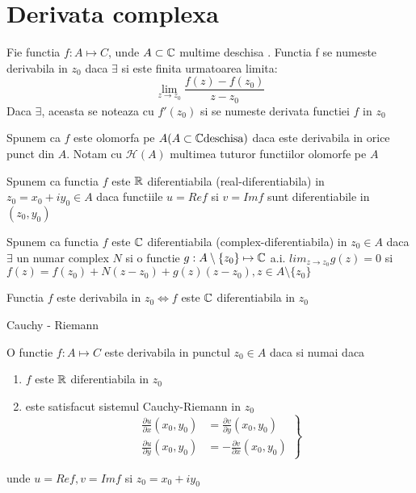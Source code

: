 \section{Derivata complexa}
\begin{definition}
	Fie functia $f:A \mapsto C$, unde $A\subset\mathbb{C}$ multime deschisa . Functia f
	se numeste derivabila in $z_0$ daca $\exists$ si este finita urmatoarea
	limita:
	\begin{equation}
		\lim_{z\to z_0} \frac{f(z)-f(z_0)}{z-z_0}
	\end{equation}
	Daca $\exists$, aceasta se noteaza cu $f'(z_0)$ si se numeste derivata
	functiei $f$ in $z_0$
\end{definition}

\begin{definition}
	Spunem ca $f$ este olomorfa pe $A (A\subset \mathbb{C} \text{deschisa})$ daca este
	derivabila in orice punct din $A$.
	Notam cu $\mathcal{H}(A)$ multimea tuturor functiilor olomorfe pe $A$
\end{definition}

\begin{definition}
	Spunem ca functia $f$ este $\mathbb{R}$ diferentiabila (real-diferentiabila)
	in $z_0 = x_0 + iy_0 \in A$ daca functiile $u=Re f$ si $v = Im f $ sunt
	diferentiabile in $(z_0, y_0)$
\end{definition}

\begin{definition}
	Spunem ca functia $f$ este $\mathbb{C}$ diferentiabila (complex-diferentiabila)
	in $z_0 \in A$ daca $\exists$ un numar complex $N$ si o functie
	$g:A\setminus \{z_0\} \mapsto \mathbb{C}$ a.i. $lim_{z\to z_0} g(z) = 0 $ si
	$f(z) = f(z_0) + N(z-z_0) + g(z)(z-z_0) , z \in A\setminus \{z_0\}$
\end{definition}

\begin{observation}
	Functia $f$ este derivabila in $z_0 \iff f$ este $\mathbb{C}$ diferentiabila in $z_0$
\end{observation}

\begin{theorem}
	Cauchy - Riemann

	O functie $f:A \mapsto C$ este derivabila in punctul $z_0 \in A$ daca si numai daca

	\begin{enumerate}
		\item $f$ este $\mathbb{R}$ diferentiabila in $z_0$
		\item este satisfacut sistemul Cauchy-Riemann in $z_0$
		\begin{equation}
			\left .
				\begin{aligned}
					\frac{\partial u}{\partial x} (x_0,y_0) &=  \frac{\partial v}{\partial y}(x_0,y_0) \\
					\frac{\partial u}{\partial y} (x_0,y_0) &= - \frac{\partial v}{\partial x}(x_0,y_0)
				\end{aligned}
			\right \}
		\end{equation}
	\end{enumerate}
	unde $u=Re f , v = Im f $ si $z_0 = x_0 + i y_0$
\end{theorem}

